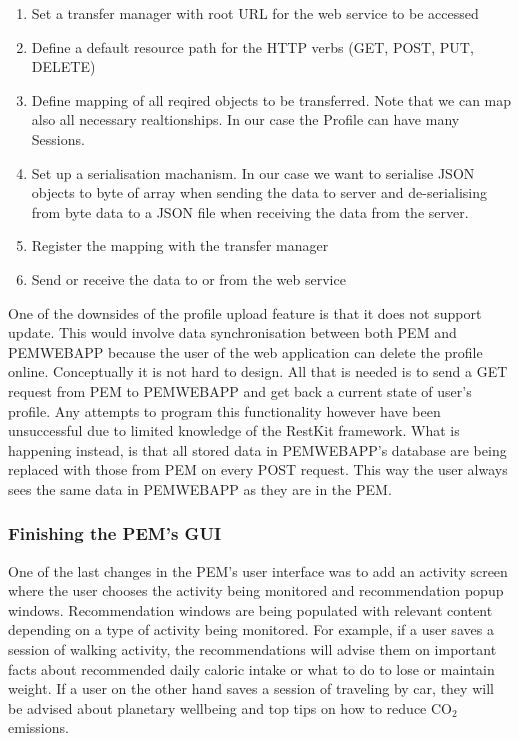 \documentclass[12pt, a4paper]{report}   %
\begin{document}
\begin{enumerate}
\begin{enumerate}
	\item Set a transfer manager with root URL for the web service to be accessed
    \item Define a default resource path for the HTTP verbs (GET, POST, PUT, DELETE)    
    \item Define mapping of all reqired objects to be transferred. Note that we can map also all necessary realtionships. In our case the Profile can have many Sessions.
	\item Set up a serialisation machanism. In our case we want to serialise JSON objects to byte of array when sending the data to server and de-serialising from byte data to a JSON file when receiving the data from the server.
    \item Register the mapping with the transfer manager
	\item Send or receive the data to or from the web service\\
\end{enumerate}
One of the downsides of the profile upload feature is that it does not support update. This would involve data synchronisation between both PEM and PEMWEBAPP because the user of the web application can delete the profile online. Conceptually it is not hard to design. All that is needed is to send a GET request from PEM to PEMWEBAPP and get back a current state of user's profile. Any attempts to program this functionality however have been unsuccessful due to limited knowledge of the RestKit framework. What is happening instead, is that all stored data in PEMWEBAPP's database are being replaced with those from PEM on every POST request. This way the user always sees the same data in PEMWEBAPP as they are in the PEM.


\subsubsection{Finishing the PEM's GUI}
One of the last changes in the PEM's user interface was to add an activity screen where the user chooses the activity being monitored and recommendation popup windows. Recommendation windows are being populated with relevant content depending on a type of activity being monitored. For example, if a user saves a session of walking activity, the recommendations will advise them on important facts about recommended daily caloric intake or what to do to lose or maintain weight. If a user on the other hand saves a session of traveling by car, they will be advised about planetary wellbeing and top tips on how to reduce CO$_{2}$ emissions.



\end{enumerate}
\end{document}
